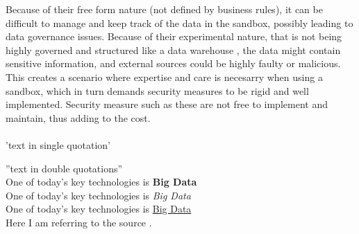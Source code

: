 Because of their free form nature (not defined by business rules), it can be difficult to manage and keep track of the data in the sandbox, possibly leading to data governance issues.
Because of their experimental nature, that is not being highly governed and structured like a data warehouse \cite{l2video}, the data might contain sensitive information, and external sources could be highly faulty or malicious.
This creates a scenario where expertise and care is necesarry when using a sandbox, which in turn demands security measures to be rigid and well implemented. Security measure such as these are not free to implement and maintain, thus adding to the cost.
\\\\

\newpage 
'text in single quotation'

''text in double quotations''\\

One of today’s key technologies is \textbf{Big Data}\\
One of today’s key technologies is \textit{Big Data}\\
One of today’s key technologies is \underline{Big Data}\\

Here I am referring to the source \cite{BigData}.